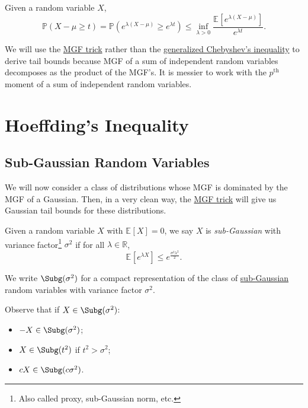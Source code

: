 \begin{lemma}\label{lma:MGF-trick}
	Given a random variable \(X\),
	\[
		\mathbb{P} (X - \mu \geq t) = \mathbb{P} (e^{\lambda (X - \mu ) } \geq e^{\lambda t}) \leq \inf _{\lambda > 0} \frac{\mathbb{E}_{}\left[e^{\lambda (X - \mu )} \right] }{e^{\lambda t}}.
	\]
\end{lemma}

We will use the \hyperref[lma:MGF-trick]{MGF trick} rather than the \hyperref[lma:Chebyshev-inequality]{generalized Chebyshev's inequality} to derive tail bounds because MGF of a sum of independent random variables decomposes as the product of the MGF's. It is messier to work with the \(p^{\text{th} } \) moment of a sum of independent random variables.

\section{Hoeffding's Inequality}
\subsection{Sub-Gaussian Random Variables}
We will now consider a class of distributions whose MGF is dominated by the MGF of a Gaussian. Then, in a very clean way, the \hyperref[lma:MGF-trick]{MGF trick} will give us Gaussian tail bounds for these distributions.

\begin{definition}\label{def:sub-Gaussian}
	Given a random variable \(X\) with \(\mathbb{E}_{}\left[X \right] = 0\), we say \(X\) is \emph{sub-Gaussian} with variance factor\footnote{Also called proxy, sub-Gaussian norm, etc.} \(\sigma ^2\) if for all \(\lambda \in \mathbb{R} \),
	\[
		\mathbb{E}_{}\left[e^{\lambda X} \right] \leq e^{\frac{\sigma ^2 \lambda ^2}{2}}.
	\]
\end{definition}

\begin{notation}
	We write \(\Subg(\sigma ^{2} ) \) for a compact representation of the class of \hyperref[def:sub-Gaussian]{sub-Gaussian} random variables with variance factor \(\sigma ^{2} \).
\end{notation}

\begin{remark}
	Observe that if \(X\in \Subg(\sigma ^{2} ) \):
	\begin{itemize}
		\item \(-X\in \Subg(\sigma ^{2} ) \);
		\item \(X \in \Subg(t^2) \) if \(t^2 > \sigma ^{2} \);
		\item \(cX\in \Subg(c \sigma ^{2} ) \).
	\end{itemize}
\end{remark}


